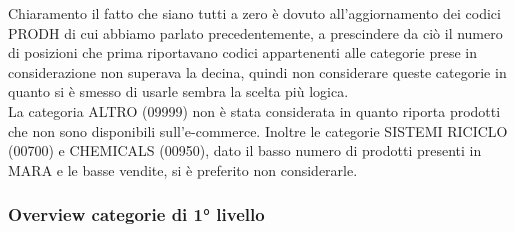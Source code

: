 Chiaramento il fatto che siano tutti a zero è dovuto all'aggiornamento dei codici PRODH di cui abbiamo parlato precedentemente, a prescindere da ciò il numero di posizioni che prima riportavano codici appartenenti alle categorie prese in considerazione non superava la decina, quindi non considerare queste categorie in quanto si è smesso di usarle sembra la scelta più logica.\\
La categoria ALTRO (09999) non è stata considerata in quanto riporta prodotti che non sono disponibili sull'e-commerce.
Inoltre le categorie SISTEMI RICICLO (00700) e CHEMICALS (00950), dato il basso numero di prodotti presenti in MARA e le basse vendite, si è preferito non considerarle.
\subsubsection{Overview categorie di 1° livello}

\newline

